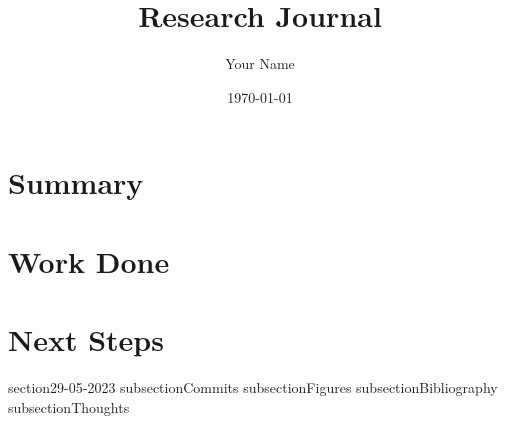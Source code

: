 \documentclass{article}
\begin{document}
\title{Research Journal}
\author{Your Name}
\date{\today}

\maketitle

\section{Summary}

\section{Work Done}

\section{Next Steps}



section{29-05-2023}     subsection{Commits}     subsection{Figures}     subsection{Bibliography}     subsection{Thoughts}     
\end{document}
